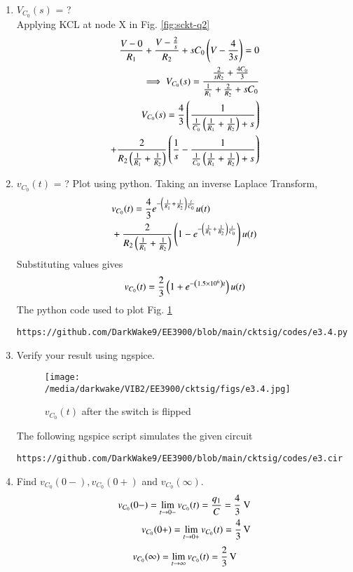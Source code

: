 \documentclass[journal,12pt,twocolumn]{IEEEtran}
\renewcommand\thesection{\arabic{section}}
\begin{document}
\begin{enumerate}[label=\arabic*.,ref=\thesection.\theenumi]
\item $V_{C_0}(s)$ = ?
\solution\\
Applying KCL at node X in Fig. \ref{fig:sckt-q2}
\begin{align}
	\frac{V - 0}{R_1} + \frac{V - \frac{2}{s}}{R_2} + sC_0\left(V - \frac{4}{3s}\right) = 0 \\
	\implies V_{C_0}(s) = \frac{\frac{2}{sR_2} + \frac{4C_0}{3}}{\frac{1}{R_1} + \frac{2}{R_2} + sC_0}\\
	\label{eq:v2-s}
	V_{C_0}(s) = \frac{4}{3}\left(\frac{1}{\frac{1}{C_0}\left(\frac{1}{R_1} + \frac{1}{R_2}\right)+s}\right) \nonumber \\
	+ \frac{2}{R_2\left(\frac{1}{R_1} +\frac{1}{R_2}\right)}\left(\frac{1}{s} - \frac{1}{\frac{1}{C_0}\left(\frac{1}{R_1} + \frac{1}{R_2}\right) + s}\right)
\end{align}
\item $v_{C_0}(t)$ = ? Plot using python.
Taking an inverse Laplace Transform,
\begin{align}
	&v_{C_0}(t) = \frac{4}{3}e^{-\left(\frac{1}{R_1} + \frac{1}{R_2}\right)\frac{t}{C_0}}u(t) \nonumber \\ 
	&+ \frac{2}{R_2\left(\frac{1}{R_1}+\frac{1}{R_2}\right)}\left(1 - e^{-\left(\frac{1}{R_1} + \frac{1}{R_2}\right)\frac{t}{C_0}}\right)u(t)
\end{align}
Substituting values gives
\begin{align}
	v_{C_0}(t) = \frac{2}{3}\left(1 +e^{-\left(1.5 \times 10^6\right)t}\right)u(t)
	\label{eq:v2-t}
\end{align}
The python code used to plot Fig. \ref{fig:v2-t}
\begin{lstlisting}
https://github.com/DarkWake9/EE3900/blob/main/cktsig/codes/e3.4.py
\end{lstlisting}
\item Verify your result using ngspice.\\
\solution
\begin{figure}[!htb]
	\texttt{[image: /media/darkwake/VIB2/EE3900/cktsig/figs/e3.4.jpg]}
	\caption{$v_{C_0}(t)$ after the switch is flipped}
	\label{fig:v2-t}
\end{figure}
 The following ngspice script simulates the given circuit
\begin{lstlisting}
https://github.com/DarkWake9/EE3900/blob/main/cktsig/codes/e3.cir
\end{lstlisting}
\item Find $v_{C_0}(0-), v_{C_0}(0+)$ and  $v_{C_0}(\infty) $.\\
\solution
\begin{align}
	v_{C_0}(0-) = \lim_{t \to 0-}v_{C_0}(t) = \frac{q_1}{C} = \frac{4}{3}\text{ V}\\
	v_{C_0}(0+) = \lim_{t \to 0+}v_{C_0}(t) = \SI[parse-numbers=false]{\frac{4}{3}}{\V}
\end{align}
\begin{align}
	v_{C_0}(\infty) = \lim_{t \to \infty}v_{C_0}(t) = \SI[parse-numbers=false]{\frac{2}{3}}{\V}
\end{align}


\end{enumerate}
\end{document}
